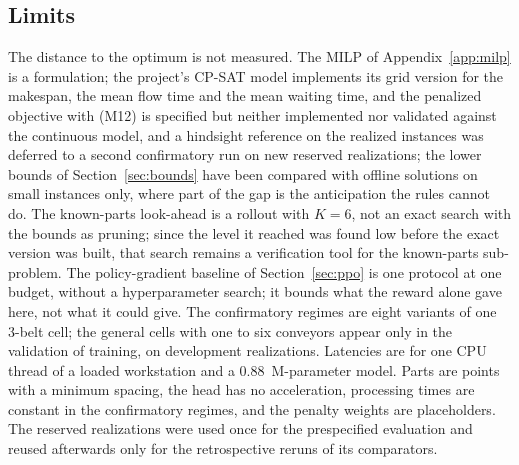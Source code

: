 \documentclass[11pt,a4paper]{article}
\theoremstyle{plain}
\theoremstyle{definition}
\theoremstyle{remark}
\begin{document}
\subsection{Limits}\label{sec:limits}
The distance to the optimum is not measured. The MILP of Appendix~\ref{app:milp} is a
formulation; the project's CP-SAT model implements its grid version for the makespan, the
mean flow time and the mean waiting time, and the penalized objective with (M12) is
specified but neither implemented nor validated against the continuous model, and a hindsight reference on the realized
instances was deferred to a second confirmatory run on new reserved realizations; the
lower bounds of Section~\ref{sec:bounds} have been compared with offline solutions on
small instances only, where part of the gap is the anticipation the rules cannot do. The
known-parts look-ahead is a rollout with $K=6$, not an exact search with the bounds as
pruning; since the level it reached was found low before the exact version was built, that search
remains a verification tool for the known-parts sub-problem. The policy-gradient baseline
of Section~\ref{sec:ppo} is one protocol at one budget, without a hyperparameter
search; it bounds what the reward alone gave here, not what it could give. The confirmatory
regimes are eight variants of one 3-belt cell; the general cells with one to six
conveyors appear only in the validation of training, on development realizations.
Latencies are for one CPU thread of a loaded workstation and a 0.88~M-parameter model.
Parts are points with a minimum spacing, the head has no acceleration, processing times
are constant in the confirmatory regimes, and the penalty weights are placeholders. The
reserved realizations were used once for the prespecified evaluation and reused afterwards
only for the retrospective reruns of its comparators.

\end{document}
